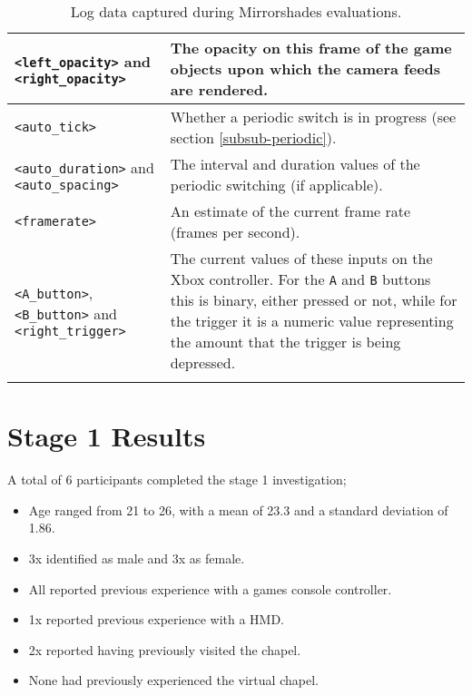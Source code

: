 \begin{center}
\begin{longtable}{ l  p{6.5cm} }
\midrule

\texttt{<left\_opacity>} and \texttt{<right\_opacity>} & The opacity on this frame of the game objects upon which the camera feeds are rendered. \\

\midrule

\texttt{<auto\_tick>} & Whether a periodic switch is in progress (see section \ref{subsub-periodic}). \\

\midrule

\texttt{<auto\_duration>} and \texttt{<auto\_spacing>} & The interval and duration values of the periodic switching (if applicable). \\

\midrule

\texttt{<framerate>} & An estimate of the current frame rate (frames per second). \\

\midrule

\texttt{<A\_button>}, \texttt{<B\_button>} and \texttt{<right\_trigger>} & The current values of these inputs on the Xbox controller. For the \texttt{A} and \texttt{B} buttons this is binary, either pressed or not, while for the trigger it is a numeric value representing the amount that the trigger is being depressed. \\

\bottomrule
\caption{Log data captured during Mirrorshades evaluations.}
\label{logdatatable}
\end{longtable}
\end{center}


\section{Stage 1 Results}

A total of 6 participants completed the stage 1 investigation;
\begin{itemize}
	\item Age ranged from 21 to 26, with a mean of 23.3 and a standard deviation of 1.86.
	\item 3x identified as male and 3x as female.
	\item All reported previous experience with a games console controller.
	\item 1x reported previous experience with a HMD.
	\item 2x reported having previously visited the chapel.
	\item None had previously experienced the virtual chapel.
\end{itemize}

